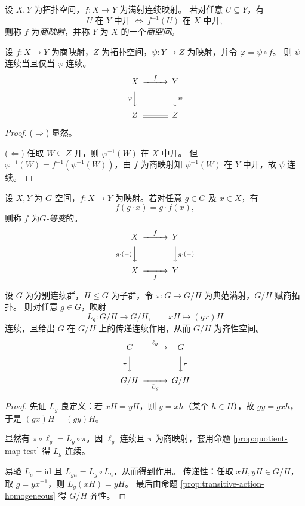 \documentclass[lang=cn,a4paper,newtx,figureplace=section,tableplace=section]{elegantbook}
\begin{document}
\begin{definition}[商映射]\label{def:quotient-map}
  设 $X,Y$ 为拓扑空间，$f:X\to Y$ 为满射连续映射。
  若对任意 $U\subseteq Y$，有
  \[
    U\text{ 在 }Y\text{ 中开}\ \Leftrightarrow\ f^{-1}(U)\text{ 在 }X\text{ 中开},
  \]
  则称 $f$ 为\emph{商映射}，并称 $Y$ 为 $X$ 的一个\emph{商空间}。
\end{definition}

\begin{proposition}\label{prop:quotient-map-test}
  设 $f:X\to Y$ 为商映射，$Z$ 为拓扑空间，$\psi:Y\to Z$ 为映射，并令 $\varphi=\psi\circ f$。
  则 $\psi$ 连续当且仅当 $\varphi$ 连续。
  \[
    \begin{CD}
      X @>f>> Y \\
      @V{\varphi}VV @VV{\psi}V \\
      Z @= Z
    \end{CD}
  \]
\end{proposition}
\begin{proof}
  ($\Rightarrow$) 显然。

  ($\Leftarrow$) 任取 $W\subseteq Z$ 开，则 $\varphi^{-1}(W)$ 在 $X$ 中开。
  但 $\varphi^{-1}(W)=f^{-1}(\psi^{-1}(W))$，由 $f$ 为商映射知 $\psi^{-1}(W)$ 在 $Y$ 中开，故 $\psi$ 连续。
\end{proof}

\begin{definition}[$G$-等变映射]\label{def:equivariant-map}
  设 $X,Y$ 为 $G$-空间，$f:X\to Y$ 为映射。若对任意 $g\in G$ 及 $x\in X$，有
  \[
    f(g\cdot x)=g\cdot f(x),
  \]
  则称 $f$ 为\emph{$G$-等变}的。
  \[
    \begin{CD}
      X @>f>> Y \\
      @V{g\cdot(-)}VV @VV{g\cdot(-)}V \\
      X @>>f> Y
    \end{CD}
  \]
\end{definition}

\begin{proposition}\label{prop:coset-space-homogeneous}
  设 $G$ 为分别连续群，$H\le G$ 为子群，令 $\pi:G\to G/H$ 为典范满射，$G/H$ 赋商拓扑。
  则对任意 $g\in G$，映射
  \[
    L_g:G/H\to G/H,\qquad xH\mapsto (gx)H
  \]
  连续，且给出 $G$ 在 $G/H$ 上的传递连续作用，从而 $G/H$ 为齐性空间。
  \[
    \begin{CD}
      G @>\ell_g>> G \\
      @V\pi VV @VV\pi V \\
      G/H @>>L_g> G/H
    \end{CD}
  \]
\end{proposition}
\begin{proof}
  先证 $L_g$ 良定义：若 $xH=yH$，则 $y=xh$（某个 $h\in H$），故 $gy=gxh$，于是 $(gx)H=(gy)H$。

  显然有 $\pi\circ\ell_g=L_g\circ\pi$。因 $\ell_g$ 连续且 $\pi$ 为商映射，套用命题 \ref{prop:quotient-map-test} 得 $L_g$ 连续。

  易验 $L_e=\mathrm{id}$ 且 $L_{gh}=L_g\circ L_h$，从而得到作用。
  传递性：任取 $xH,yH\in G/H$，取 $g=yx^{-1}$，则 $L_g(xH)=yH$。
  最后由命题 \ref{prop:transitive-action-homogeneous} 得 $G/H$ 齐性。
\end{proof}
\end{document}
